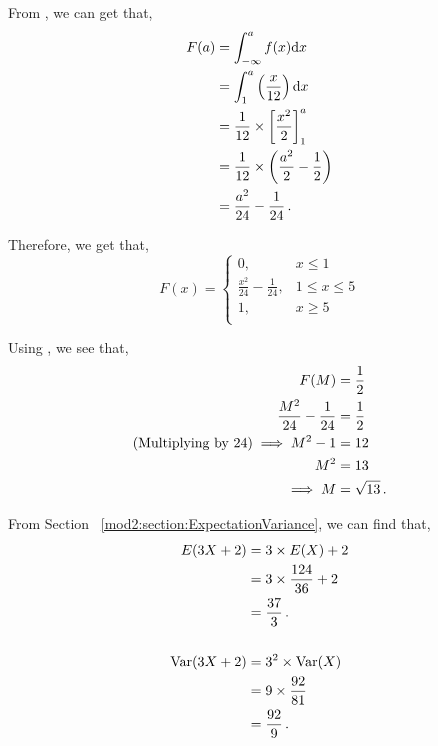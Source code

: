 \begin{subquestions}
\subquestion

From , we can get that,
\begin{align}
	F(a) & = \int_{-\infty}^{a} f(x)\mathrm{d}x \nonumber \\
	     & = \int_{1}^{a} \left(\frac{x}{12} \right)\mathrm{d}x \nonumber \\
	     & = \frac{1}{12} \times \left[ \frac{x^2}{2} \right]^a_1 \nonumber \\
	     & = \frac{1}{12} \times \left(\frac{a^2}{2} - \frac{1}{2}\right) \nonumber \\
	     & = \frac{a^2}{24} - \frac{1}{24} \,.
\end{align}

Therefore, we get that,
\[  F(x) = \begin{cases}
	 0, & x \leq 1 \\
	\frac{x^2}{24}-\frac{1}{24}, & 1\leq x\leq 5 \\
	1, & x\geq 5 \\ 
\end{cases}
\]


\subquestion

Using , we see that,
\begin{align}
	F(M) & = \frac{1}{2} \nonumber \\
	\frac{M^2}{24}-\frac{1}{24} & = \frac{1}{2} \nonumber \\
	\text{(Multiplying by 24)} \implies M^2 - 1 & = 12 \nonumber \\
	M^2 & = 13 \nonumber \\
	\implies M & = \sqrt{13} \,.
\end{align}


\subquestion

From Section ~\ref{mod2:section:ExpectationVariance}, we can find that,
\begin{align}
	E(3X+2)	& = 3\times E(X) +2 \nonumber \\
	        & = 3 \times \frac{124}{36} + 2 \nonumber \\
	        & = \frac{37}{3} \,. \\ \nonumber \\
	 \text{Var}(3X+2) & = 3^2 \times \text{Var}(X) \nonumber \\
	                  & = 9  \times \frac{92}{81} \nonumber \\
	                  & = \frac{92}{9} \,.
\end{align}


\end{subquestions}
